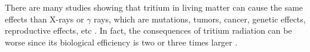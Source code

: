 There are many studies showing that tritium in living matter can cause the same effects than X-rays or $\gamma$ rays, which are mutations, tumors, cancer, genetic effects, reproductive effects, etc \cite{StraumeTritiumHazard, RytoemaaTritiumHazard}. In fact, the consequences of tritium radiation can be worse since its biological efficiency is two or three times larger \cite{StraumeTritiumHazard}.







